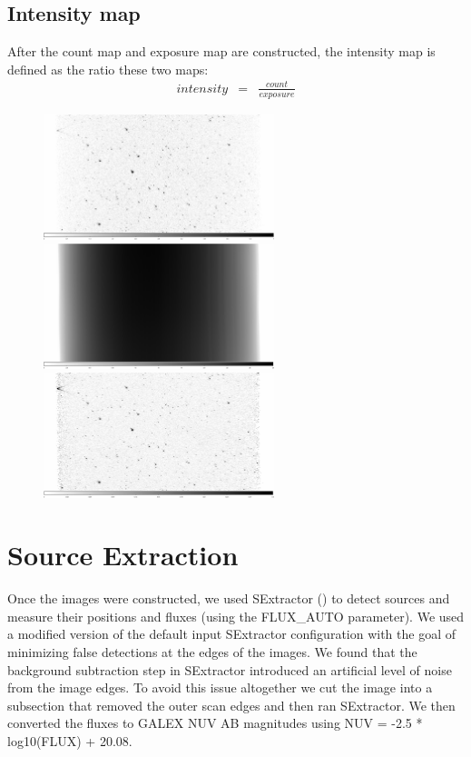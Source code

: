 \documentclass[12pt, preprint]{aastex}
\begin{document}
\subsection{Intensity map}
After the count map and exposure map are constructed, the intensity map is defined as the ratio these two maps:
\begin{eqnarray}
  intensity &=& \frac{count}{exposure}
\end{eqnarray}

\begin{figure}[p]
\begin{center}
\includegraphics[width=0.6\textwidth]{figures/count.pdf}
\includegraphics[width=0.6\textwidth]{figures/exp.pdf}
\includegraphics[width=0.6\textwidth]{figures/intensity.pdf}
\end{center}
\caption{%
  \label{map}
  }
\end{figure}

\section{Source Extraction}
Once the images were constructed, we used SExtractor (\cite{sextractor}) to detect sources and measure their positions and fluxes (using the FLUX\_AUTO parameter). We used a modified version of the default input SExtractor configuration with the goal of minimizing false detections at the edges of the images. We found that the background subtraction step in SExtractor introduced an artificial level of noise from the image edges. To avoid this issue altogether we cut the image into a subsection that removed the outer scan edges and then ran SExtractor. We then converted the fluxes to GALEX NUV AB magnitudes using NUV = -2.5 * log10(FLUX) + 20.08.
\end{document}
